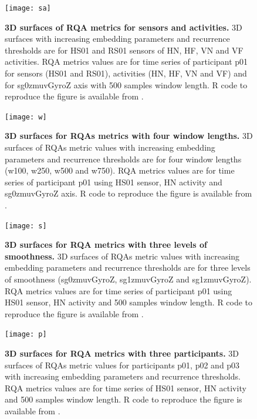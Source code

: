 \begin{figure}[!ht]
\centering
\texttt{[image: sa]}
    \caption{
	{\bf 3D surfaces of RQA metrics for sensors and activities.}
	3D surfaces with increasing embedding parameters and recurrence thresholds are 
	for HS01 and RS01 sensors of HN, HF, VN and VF activities.
	RQA metrics values are for time series of participant p01 for sensors (HS01 and RS01), 
	activities (HN, HF, VN and VF) and for 	sg0zmuvGyroZ axis  with 500 samples window length. 
	R code to reproduce the figure is available from \cite{hwum2018}.
       }
\label{fig:topo_sensoractivities}
\end{figure}
\begin{figure}[!ht]
\centering
\texttt{[image: w]}
    \caption{
	{\bf 3D surfaces for RQAs metrics with four window lengths.}
	3D surfaces of RQAs metric values with increasing embedding parameters and recurrence thresholds 
	are for four window lengths (w100, w250, w500 and  w750).
	RQA metrics values are for time series of participant p01 
	using HS01 sensor, HN activity and sg0zmuvGyroZ axis.
	R code to reproduce the figure is available from \cite{hwum2018}.
        }
\label{fig:topo_windows}
\end{figure}
\begin{figure}[!ht]
\centering
\texttt{[image: s]}
    \caption{
	{\bf 3D surfaces for RQA metrics with three levels of smoothness.}
       	3D surfaces of RQAs metric values with increasing embedding parameters and recurrence thresholds 
	are for three levels of smoothness (sg0zmuvGyroZ, sg1zmuvGyroZ and sg1zmuvGyroZ).
	RQA metrics values are for time series of participant p01 using HS01 sensor, 
	HN activity and 500 samples window length.
	R code to reproduce the figure is available from \cite{hwum2018}.
 }
\label{fig:topo_smoothness}
\end{figure}


\begin{figure}[!ht]
\centering
\texttt{[image: p]}
    \caption{
	{\bf 3D surfaces for RQA metrics with three participants.}
       	3D surfaces of RQAs metric values for participants p01, p02 and p03 
	with increasing embedding parameters and recurrence thresholds.
	RQA metrics values are for time series of HS01 sensor, 
	HN activity and 500 samples window length.
	R code to reproduce the figure is available from \cite{hwum2018}.
 }
\label{fig:topo_participants}
\end{figure}








